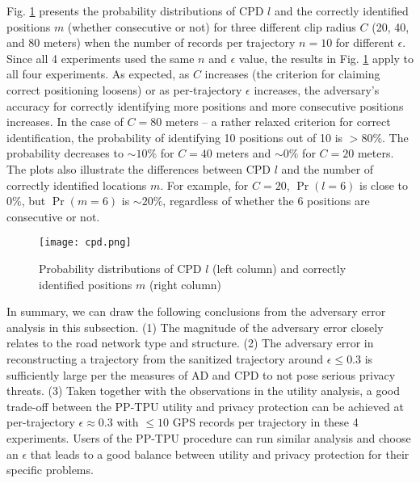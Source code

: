 \documentclass[10pt,journal,compsoc]{IEEEtran}
\begin{document}
Fig. \ref{fig:cpd} presents the probability distributions of CPD $l$ and the correctly identified positions $m$ (whether consecutive or not) for three different clip radius $C$  (20, 40, and 80 meters) when the number of records per trajectory $n=10$ for different $\epsilon$. Since all 4 experiments used the same $n$ and $\epsilon$ value, the results in Fig. \ref{fig:cpd} apply to all four experiments. As expected, as $C$ increases (the criterion for claiming correct positioning loosens) or as per-trajectory $\epsilon$ increases, the adversary's accuracy for correctly identifying more positions and more consecutive positions increases. In the case of $C=80$ meters -- a rather relaxed criterion for correct identification, the probability of identifying 10 positions out of 10 is $>80\%$. The probability decreases to $\sim10\%$ for $C\!=\!40$ meters and  $\sim0\%$ for $C\!=\!20$ meters.  The plots also illustrate the differences between CPD $l$ and the number of correctly identified locations $m$. For example, for $C=20$, $\Pr(l\!=\!6)$ is close to 0\%, but $\Pr(m\!=\!6)$ is $\sim20\%$, regardless of whether the 6 positions are consecutive or not.
\begin{figure}[!htb]
\centering\vspace{-9pt}
\texttt{[image: cpd.png]}\vspace{-3pt}
\caption{Probability distributions of CPD $l$ (left column) and correctly identified positions $m$ (right column)} \label{fig:cpd}\vspace{-9pt}
\end{figure} 

In summary,  we  can draw the following conclusions from the adversary error analysis in this subsection. (1) The magnitude of the adversary error closely relates to the road network type and structure. (2) The adversary error in reconstructing a trajectory from the sanitized trajectory around $\epsilon\le0.3$ is sufficiently large per the measures of AD and CPD to not pose serious privacy threats. (3) Taken together with the observations in the utility analysis,  a good trade-off between the PP-TPU utility and privacy protection can be achieved at per-trajectory $\epsilon\approx0.3$ with $\!\le\!10$ GPS records per trajectory in these 4 experiments. Users of the PP-TPU procedure can run similar analysis and choose an $\epsilon$ that leads to a good balance between utility and privacy protection for their specific problems.  
\end{document}
